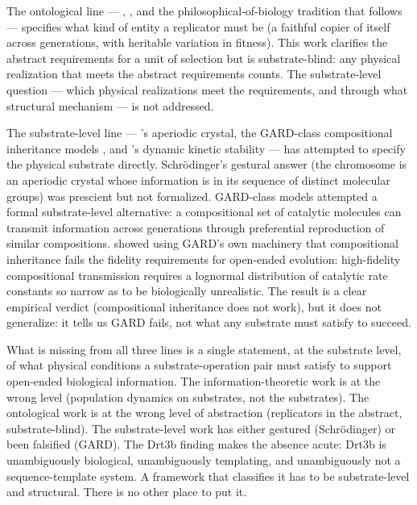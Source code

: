 \documentclass[aps,prx,reprint,amsmath,amssymb,floatfix,superscriptaddress,nofootinbib]{revtex4-2}
\theoremstyle{plain-thm}
\theoremstyle{definition-thm}
\begin{document}
The ontological line --- \citet{Hull1980}, \citet{MaynardSmith2000}, and the philosophical-of-biology tradition that follows --- specifies what kind of entity a replicator must be (a faithful copier of itself across generations, with heritable variation in fitness). This work clarifies the abstract requirements for a unit of selection but is substrate-blind: any physical realization that meets the abstract requirements counts. The substrate-level question --- which physical realizations meet the requirements, and through what structural mechanism --- is not addressed.

The substrate-level line --- \citet{Schrodinger1944}'s aperiodic crystal, the GARD-class compositional inheritance models \citep{Kauffman1986, Hordijk2012}, and \citet{Pross2011}'s dynamic kinetic stability --- has attempted to specify the physical substrate directly. Schr\"odinger's gestural answer (the chromosome is an aperiodic crystal whose information is in its sequence of distinct molecular groups) was prescient but not formalized. GARD-class models attempted a formal substrate-level alternative: a compositional set of catalytic molecules can transmit information across generations through preferential reproduction of similar compositions. \citet{Vasas2010} showed using GARD's own machinery that compositional inheritance fails the fidelity requirements for open-ended evolution: high-fidelity compositional transmission requires a lognormal distribution of catalytic rate constants so narrow as to be biologically unrealistic. The result is a clear empirical verdict (compositional inheritance does not work), but it does not generalize: it tells us GARD fails, not what any substrate must satisfy to succeed.

What is missing from all three lines is a single statement, at the substrate level, of what physical conditions a substrate-operation pair must satisfy to support open-ended biological information. The information-theoretic work is at the wrong level (population dynamics on substrates, not the substrates). The ontological work is at the wrong level of abstraction (replicators in the abstract, substrate-blind). The substrate-level work has either gestured (Schr\"odinger) or been falsified (GARD). The Drt3b finding makes the absence acute: Drt3b is unambiguously biological, unambiguously templating, and unambiguously not a sequence-template system. A framework that classifies it has to be substrate-level and structural. There is no other place to put it.
\end{document}
